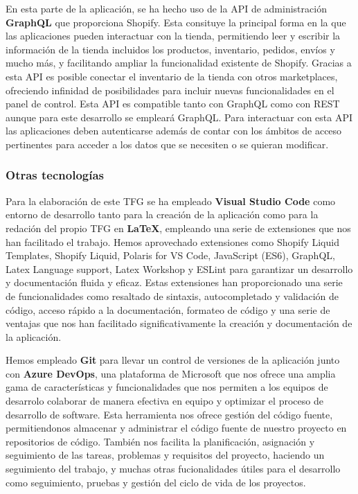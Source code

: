 \documentclass[12pt]{article}
\begin{document}
En esta parte de la aplicación, se ha hecho uso de la API de administración \textbf{GraphQL} que proporciona Shopify. Esta consituye la principal forma en la que 
las aplicaciones pueden interactuar con la tienda, permitiendo leer y escribir la información de la tienda incluidos los productos, inventario, pedidos,
envíos y mucho más, y facilitando ampliar la funcionalidad existente de Shopify. Gracias a esta API es posible conectar el inventario
de la tienda con otros marketplaces, ofreciendo infinidad de posibilidades para incluir nuevas funcionalidades en el panel de control.
Esta API es compatible tanto con GraphQL como con REST aunque para este desarrollo se empleará GraphQL. Para interactuar con esta API las aplicaciones
deben autenticarse además de contar con los ámbitos de acceso pertinentes para acceder a los datos que se necesiten o se quieran modificar. \cite{shopify-dev}


\subsubsection{Otras tecnologías}
Para la elaboración de este TFG se ha empleado \textbf{Visual Studio Code} como entorno de desarrollo tanto para la creación de la aplicación como para
la redación del propio TFG en \textbf{LaTeX}, empleando una serie de extensiones que nos han facilitado el trabajo. 
Hemos aprovechado extensiones como Shopify Liquid Templates, Shopify Liquid, 
Polaris for VS Code, JavaScript (ES6), GraphQL, Latex Language support, Latex Workshop y ESLint para garantizar un desarrollo y documentación
fluida y eficaz. Estas extensiones han proporcionado una serie de funcionalidades como resaltado de sintaxis, autocompletado y validación de código, 
acceso rápido a la documentación, formateo de código y una serie de ventajas que nos han facilitado significativamente la creación y documentación de la aplicación.

Hemos empleado \textbf{Git} para llevar un control de versiones de la aplicación junto con \textbf{Azure DevOps}, una plataforma de Microsoft que nos ofrece una amplia
gama de características y funcionalidades que nos permiten a los equipos de desarrolo colaborar de manera efectiva en equipo y optimizar el proceso de desarrollo
de software. Esta herramienta nos ofrece gestión del código fuente, permitiendonos almacenar y administrar el código fuente de nuestro proyecto en 
repositorios de código. También nos facilita la planificación, asignación y seguimiento de las tareas, problemas y requisitos del proyecto, haciendo
un seguimiento del trabajo, y muchas otras fucionalidades útiles para el desarrollo como seguimiento, pruebas y gestión del ciclo de vida de los proyectos. \cite{devOps}
\end{document}
